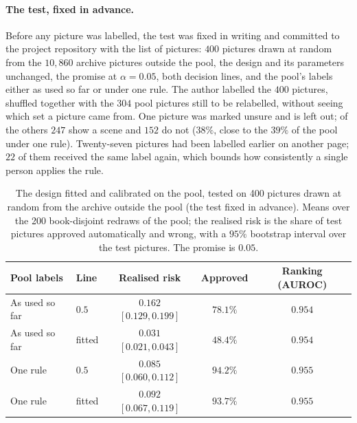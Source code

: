 \paragraph{The test, fixed in advance.} Before any picture was labelled, the test was fixed in writing and committed to the project repository with the list of pictures: $400$ pictures drawn at random from the $10{,}860$ archive pictures outside the pool, the design and its parameters unchanged, the promise at $\alpha = 0.05$, both decision lines, and the pool's labels either as used so far or under one rule. The author labelled the $400$ pictures, shuffled together with the $304$ pool pictures still to be relabelled, without seeing which set a picture came from. One picture was marked unsure and is left out; of the others $247$ show a scene and $152$ do not ($38\%$, close to the $39\%$ of the pool under one rule). Twenty-seven pictures had been labelled earlier on another page; $22$ of them received the same label again, which bounds how consistently a single person applies the rule.

\begin{table}[!htbp]
\centering
\caption[The risk promise on random archive pictures]{The design fitted and calibrated on the pool, tested on 400 pictures drawn at random from the archive outside the pool (the test fixed in advance). Means over the 200 book-disjoint redraws of the pool; the realised risk is the share of test pictures approved automatically and wrong, with a $95\%$ bootstrap interval over the test pictures. The promise is $0.05$.}
\label{tab:archive_check}
\small
\begin{tabular}{llccc}
\toprule
Pool labels & Line & Realised risk & Approved & Ranking (AUROC) \\
\midrule
As used so far & $0.5$ & $\mathbf{0.162}$ $[0.129, 0.199]$ & $78.1\%$ & $0.954$ \\
As used so far & fitted & $0.031$ $[0.021, 0.043]$ & $48.4\%$ & $0.954$ \\
One rule & $0.5$ & $\mathbf{0.085}$ $[0.060, 0.112]$ & $94.2\%$ & $0.955$ \\
One rule & fitted & $\mathbf{0.092}$ $[0.067, 0.119]$ & $93.7\%$ & $0.955$ \\
\bottomrule
\end{tabular}
\end{table}

